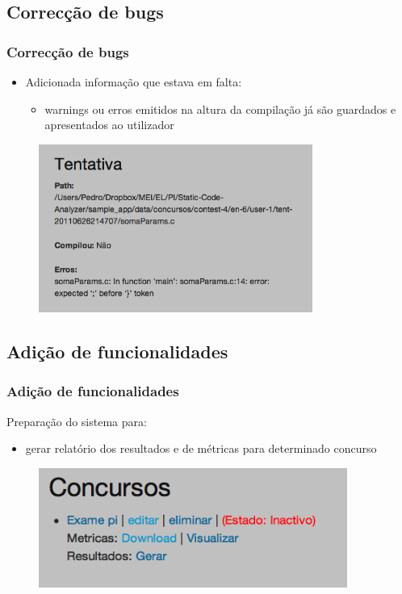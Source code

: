 \documentclass{beamer}
\begin{document}
\subsection{Correcção de bugs}
\begin{frame} \frametitle{Correcção de bugs}
\begin{itemize}
\item Adicionada informação que estava em falta:
	\begin{itemize}
	\item warnings ou erros emitidos na altura da compilação já são guardados e apresentados ao utilizador
	\end{itemize}
\end{itemize}

\begin{figure}[h]
\begin{center}
\includegraphics[width=0.8\textwidth]{imagens/erros.png}
\end{center}
\end{figure}

\end{frame}

\subsection{Adição de funcionalidades}
\begin{frame} \frametitle{Adição de funcionalidades}
Preparação do sistema para:
\begin{itemize}
\item gerar relatório dos resultados e de métricas para determinado concurso
\end{itemize}

\begin{figure}[h]
\begin{center}
\includegraphics[width=0.9\textwidth]{imagens/concurso.png}
\end{center}
\end{figure}

\end{frame}
\end{document}

